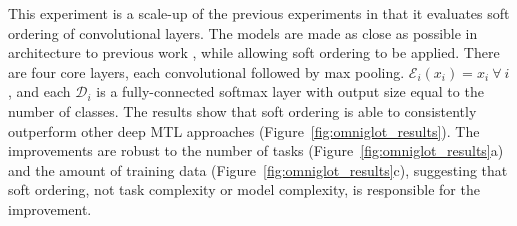 \documentclass{article}
\theoremstyle{definition}
\theoremstyle{remark}
\begin{document}
This experiment is a scale-up of the previous experiments in that it evaluates soft ordering of convolutional layers.
The models are made as close as possible in architecture to previous work \citep{Yang:2017}, while allowing soft ordering to be applied.
There are four core layers, each convolutional followed by max pooling.
$\mathcal{E}_i(x_i) = x_i \ \forall \ i$, and
each $\mathcal{D}_i$ is a fully-connected softmax layer with output size equal to the number of classes.
The results show that soft ordering is able to consistently outperform other deep MTL approaches (Figure~\ref{fig:omniglot_results}). The improvements are robust to the number of tasks (Figure~\ref{fig:omniglot_results}a) and the amount of training data (Figure~\ref{fig:omniglot_results}c), suggesting that soft ordering, not task complexity or model complexity, is responsible for the improvement.
\end{document}
